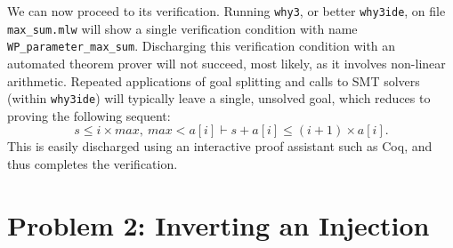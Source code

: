 We can now proceed to its verification.
Running \texttt{why3}, or better \texttt{why3ide}, on file
\verb|max_sum.mlw| will show a single verification condition with name
\verb|WP_parameter_max_sum|.
Discharging this verification condition with an automated theorem
prover will not succeed, most likely, as it involves non-linear
arithmetic. Repeated applications of goal splitting and calls to
SMT solvers (within \texttt{why3ide}) will typically leave a single,
unsolved goal, which reduces to proving the following sequent:
\begin{displaymath}
  s \le i \times max, ~ max < a[i] \vdash s + a[i] \le (i+1) \times a[i].
\end{displaymath}
This is easily discharged using an interactive proof assistant such as
Coq, and thus completes the verification.

\section{Problem 2: Inverting an Injection}

